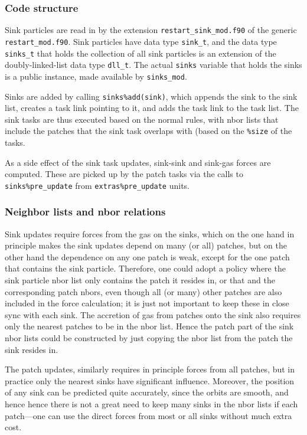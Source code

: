 \documentclass[paper=a4,fontsize=11pt]{scrartcl}
\numberwithin{equation}{section}		%
\numberwithin{figure}{section}			%
\numberwithin{table}{section}				%
\newcommand{\codecolor}{\color{Blue}}
\newcommand{\Code}[1]{{\codecolor\texttt{#1}}}
\begin{document}
\subsubsection{Code structure}
Sink particles are read in by the extension \Code{restart\_sink\_mod.f90} of the generic \Code{restart\_mod.f90}.  Sink particles have data type \Code{sink\_t}, and the data type \Code{sinks\_t} that holds the collection of all sink particles is an extension of the doubly-linked-list data type \Code{dll\_t}.  The actual \Code{sinks} variable that holds the sinks is a public instance, made available by \Code{sinks\_mod}.

Sinks are added by calling \Code{sinks\%add(sink)}, which appends the sink to the sink list, creates a task link pointing to it, and adds the task link to the task list.  The sink tasks are thus executed based on the normal rules, with nbor lists that include the patches that the sink task overlaps with (based on the \Code{\%size} of the tasks.

As a side effect of the sink task updates, sink-sink and sink-gas forces are computed.  These are picked up by the patch tasks via the calls to \Code{sinks\%pre\_update} from \Code{extras\%pre\_update}
units.

\subsubsection{Neighbor lists and nbor relations}
Sink updates require forces from the gas on the sinks, which on the one hand in principle makes the sink updates depend on many (or all) patches, but on the other hand the dependence on any one patch is weak, except for the one patch that contains the sink particle.  Therefore, one could adopt a policy where the sink particle nbor list only contains the patch it resides in, or that and the corresponding patch nbors, even though all (or many) other patches are also included in the force calculation; it is just not important to keep these in close sync with each sink. The accretion of gas from patches onto the sink also requires only the nearest patches to be in the nbor list.  Hence the patch part of the sink nbor lists could be constructed by just copying the nbor list from the patch the sink resides in.

The patch updates, similarly requires in principle forces from all patches, but in practice only the nearest sinks have significant influence.  Moreover, the position of any sink can be predicted quite accurately, since the orbits are smooth, and hence hence there is not a great need to keep many sinks in the nbor lists if each patch---one can use the direct forces from most or all sinks without much extra cost.
\end{document}
